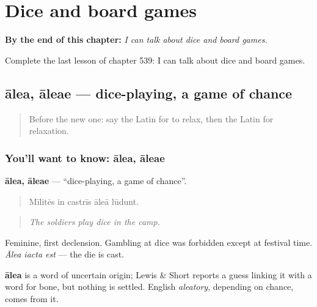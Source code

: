 
\chapter{Dice and board games}
\label{ch:la-dice-and-board-games}

\begin{chapteropening}
\textbf{By the end of this chapter:} \emph{I can talk about dice and board games.}

Complete the last lesson of chapter 539: I can talk about dice and board games.
\end{chapteropening}

\section[ālea, āleae]{ālea, āleae — dice-playing, a game of chance}

\label{lesson:LA-C539-alea}



\begin{quote}
Before the new one: say the Latin for to relax, then the Latin for relaxation.
\end{quote}

\subsection*{You'll want to know: ālea, āleae}
\textbf{ālea, āleae} — \textquotedblleft{}dice-playing, a game of chance\textquotedblright{}.

\begin{quote}
Mīlitēs in castrīs āleā lūdunt.
\end{quote}

\begin{quote}
\emph{The soldiers play dice in the camp.}
\end{quote}

Feminine, first declension. Gambling at dice was forbidden except at festival time. \emph{Ālea iacta est} — the die is cast.

\begin{cousinweb}
\textbf{ālea} is a word of uncertain origin; Lewis \& Short reports a guess linking it with a word for bone, but nothing is settled. English \emph{aleatory}, depending on chance, comes from it.
\end{cousinweb}

